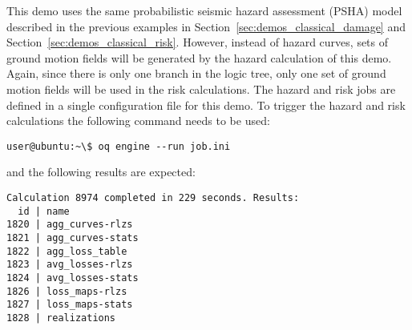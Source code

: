 This demo uses the same probabilistic seismic hazard assessment (PSHA) model
described in the previous examples in Section~\ref{sec:demos_classical_damage}
and Section~\ref{sec:demos_classical_risk}. However, instead of hazard curves,
sets of ground motion fields will be generated by the hazard calculation of
this demo. Again, since there is only one branch in the logic tree, only one
set of ground motion fields will be used in the risk calculations. The hazard
and risk jobs are defined in a single configuration file for this demo. To
trigger the hazard and risk calculations the following command needs to be
used:

\begin{verbatim}
user@ubuntu:~\$ oq engine --run job.ini
\end{verbatim}

and the following results are expected:

\begin{verbatim}
Calculation 8974 completed in 229 seconds. Results:
  id | name
1820 | agg_curves-rlzs
1821 | agg_curves-stats
1822 | agg_loss_table
1823 | avg_losses-rlzs
1824 | avg_losses-stats
1826 | loss_maps-rlzs
1827 | loss_maps-stats
1828 | realizations
\end{verbatim}
